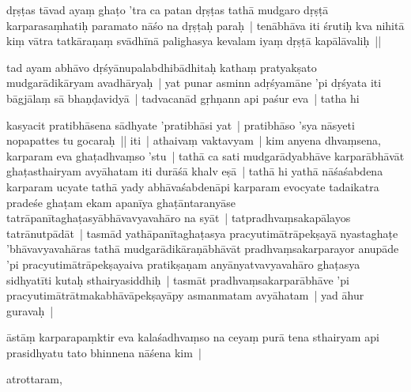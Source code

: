 \documentclass[article,12pt,a4paper]{memoir}%
\newcounter{parCount}
\begin{document}
	{}
	\pend%
      

	  \pstart \leavevmode%
	dṛṣṭas tāvad ayaṃ ghaṭo 'tra ca patan dṛṣṭas tathā mudgaro dṛṣṭā karparasaṃhatiḥ paramato nāśo na dṛṣṭaḥ paraḥ | tenābhāva iti śrutiḥ kva nihitā kiṃ vātra tatkāraṇaṃ svādhīnā palighasya kevalam iyaṃ dṛṣṭā kapālāvaliḥ || 
	{}
	\pend%
      

	  \pstart \leavevmode%
	tad ayam abhāvo dṛśyānupalabdhibādhitaḥ kathaṃ pratyakṣato mudgarādikāryam avadhāryaḥ | \label{thakur75-118.29} yat punar asminn adṛśyamāne 'pi dṛśyata iti bāgjālaṃ sā bhaṇḍavidyā | tadvacanād gṛhṇann api paśur eva | tatha hi
	{}
	\pend%
      

	  \pstart \leavevmode%
	kasyacit pratibhāsena sādhyate 'pratibhāsi yat | pratibhāso 'sya nāsyeti nopapattes tu gocaraḥ || iti | \label{thakur75-119.1} athaivaṃ vaktavyam | kim anyena dhvaṃsena, karparam eva ghaṭadhvaṃso 'stu | tathā ca sati mudgarādyabhāve karparābhāvāt ghaṭasthairyam avyāhatam iti \label{thakur75-119.2} durāśā khalv eṣā | tathā hi yathā nāśaśabdena karparam ucyate tathā yady abhāvaśabdenāpi karparam evocyate tadaikatra pradeśe ghaṭam ekam apanīya ghaṭāntaranyāse tatrāpanītaghaṭasyābhāvavyavahāro na syāt | tatpradhvaṃsakapālayos tatrānutpādāt | tasmād yathāpanītaghaṭasya pracyutimātrāpekṣayā nyastaghaṭe 'bhāvavyavahāras tathā mudgarādikāraṇābhāvāt pradhvaṃsakarparayor anupāde 'pi pracyutimātrāpekṣayaiva pratikṣaṇam anyānyatvavyavahāro ghaṭasya sidhyatīti kutaḥ sthairyasiddhiḥ | tasmāt pradhvaṃsakarparābhāve 'pi pracyutimātrātmakabhāvāpekṣayāpy asmanmatam avyāhatam | \label{thakur75-119.9} yad āhur guravaḥ |
	{}
	\pend%
      

	  \pstart \leavevmode%
	āstāṃ karparapaṃktir eva kalaśadhvaṃso na ceyaṃ purā tena sthairyam api prasidhyatu tato bhinnena nāśena kim |
	{}
	\pend%
      

	  \pstart \leavevmode%
	atrottaram,
	{}
	\pend%
      
\end{document}
